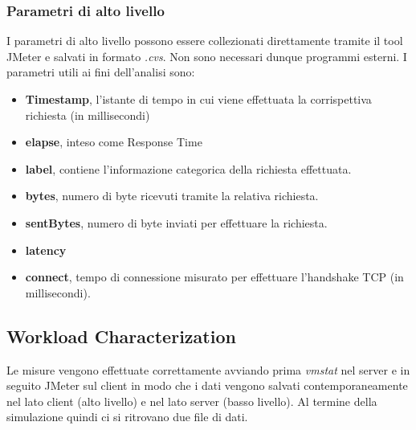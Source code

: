 \subsubsection{Parametri di alto livello}
I parametri di alto livello possono essere collezionati direttamente tramite il tool JMeter e salvati in formato \textit{.cvs}. Non sono necessari dunque programmi esterni. I parametri utili ai fini dell'analisi sono:
\begin{itemize}
	\item \textbf{Timestamp}, l'istante di tempo in cui viene effettuata la corrispettiva richiesta (in millisecondi)
	\item \textbf{elapse}, inteso come Response Time
	\item \textbf{label}, contiene l'informazione categorica della richiesta effettuata.
	\item \textbf{bytes}, numero di byte ricevuti tramite la relativa richiesta.
	\item \textbf{sentBytes}, numero di byte inviati per effettuare la richiesta.
	\item \textbf{latency}
	\item \textbf{connect}, tempo di connessione misurato per effettuare l'handshake TCP (in millisecondi).
\end{itemize}

\subsection{Workload Characterization}
Le misure vengono effettuate correttamente avviando prima \textit{vmstat} nel server e in seguito JMeter sul client in modo che i dati vengono salvati contemporaneamente nel lato client (alto livello) e nel lato server (basso livello). Al termine della simulazione quindi ci si ritrovano due file di dati.


